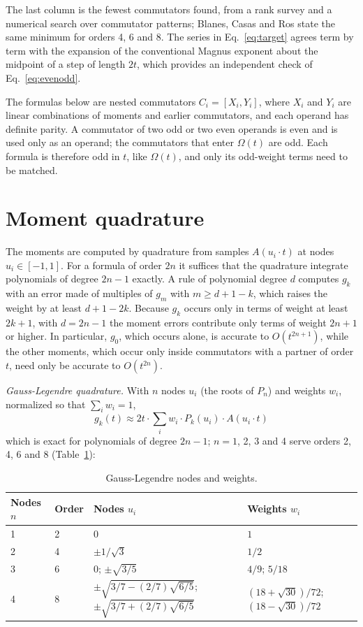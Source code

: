 \documentclass[12pt]{article}
\begin{document}
\noindent The last column is the fewest commutators found, from a rank survey and a numerical search over commutator patterns; Blanes, Casas and Ros \cite{bcr2002} state the same minimum for orders 4, 6 and 8. The series in Eq.~\ref{eq:target} agrees term by term with the expansion of the conventional Magnus exponent about the midpoint of a step of length $2t$, which provides an independent check of Eq.~\ref{eq:evenodd}.

The formulas below are nested commutators $C_i=[X_i,Y_i]$, where $X_i$ and $Y_i$ are linear combinations of moments and earlier commutators, and each operand has definite parity. A commutator of two odd or two even operands is even and is used only as an operand; the commutators that enter $\Omega(t)$ are odd. Each formula is therefore odd in $t$, like $\Omega(t)$, and only its odd-weight terms need to be matched.

\section*{Moment quadrature}

The moments are computed by quadrature from samples $A(u_i\cdot t)$ at nodes $u_i\in[-1,1]$. For a formula of order $2n$ it suffices that the quadrature integrate polynomials of degree $2n-1$ exactly. A rule of polynomial degree $d$ computes $g_k$ with an error made of multiples of $g_m$ with $m\ge d+1-k$, which raises the weight by at least $d+1-2k$. Because $g_k$ occurs only in terms of weight at least $2k+1$, with $d=2n-1$ the moment errors contribute only terms of weight $2n+1$ or higher. In particular, $g_0$, which occurs alone, is accurate to $O(t^{2n+1})$, while the other moments, which occur only inside commutators with a partner of order $t$, need only be accurate to $O(t^{2n})$.

\emph{Gauss-Legendre quadrature.} With $n$ nodes $u_i$ (the roots of $P_n$) and weights $w_i$, normalized so that $\sum_i w_i=1$,
\begin{equation}
g_{k}(t)\approx 2t\cdot\sum_{i}w_{i}\cdot P_{k}(u_{i})\cdot A(u_{i}\cdot t)\label{eq:gauss}
\end{equation}
which is exact for polynomials of degree $2n-1$; $n=1$, 2, 3 and 4 serve orders 2, 4, 6 and 8 (Table~\ref{tab:gauss}):

\begin{table}[H]
\centering\small
\caption{Gauss-Legendre nodes and weights.}\label{tab:gauss}
\begin{tabular}{llll}
\hline
Nodes $n$ & Order & Nodes $u_i$ & Weights $w_i$ \\ \hline
1 & 2 & $0$ & $1$ \\
2 & 4 & $\pm1/\sqrt{3}$ & $1/2$ \\
3 & 6 & $0$; $\pm\sqrt{3/5}$ & $4/9$; $5/18$ \\
4 & 8 & $\pm\sqrt{3/7-(2/7)\sqrt{6/5}}$; $\pm\sqrt{3/7+(2/7)\sqrt{6/5}}$ & $(18+\sqrt{30})/72$; $(18-\sqrt{30})/72$ \\ \hline
\end{tabular}
\end{table}
\end{document}
